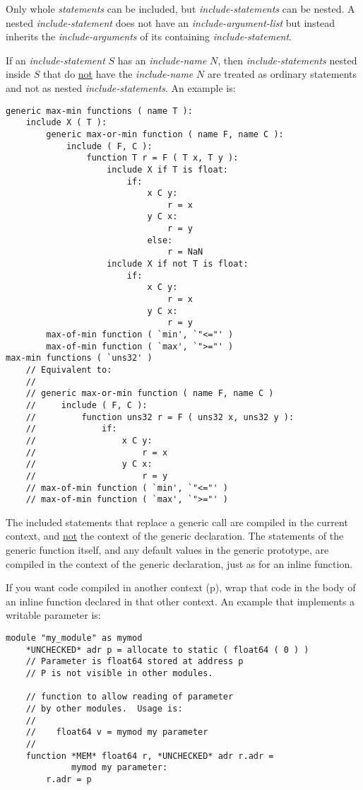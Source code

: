 \documentclass[12pt]{article}
\newcommand{\pagref}[1]{p\pageref{#1}}
\newenvironment{indpar}[1][0.3in]%
	{\begin{list}{}%
		     {\setlength{\itemsep}{0in}%
		      \setlength{\topsep}{0in}%
		      \setlength{\parsep}{1ex}%
		      \setlength{\labelwidth}{#1}%
		      \setlength{\leftmargin}{#1}%
		      \addtolength{\leftmargin}{\labelsep}}%
	 \item}%
	{\end{list}}
\begin{document}
Only whole {\em statements} can be included, but {\em include-statements}
can be nested.  A nested {\em include-statement} does not have an
{\em include-argument-list} but instead inherits the {\em include-arguments}
of its containing {\em include-statement}.

If an {\em include-statement} $S$ has an {\em include-name} $N$, then
{\em include-statements} nested inside $S$ that do \underline{not}
have the {\em include-name} $N$ are treated as ordinary statements
and not as nested {\em include-statements}.  An example is:
\begin{indpar}\begin{verbatim}
generic max-min functions ( name T ):
    include X ( T ):
        generic max-or-min function ( name F, name C ):
            include ( F, C ):
                function T r = F ( T x, T y ):
                    include X if T is float:
                        if:
                            x C y:
                                r = x
                            y C x:
                                r = y
                            else:
                                r = NaN
                    include X if not T is float:
                        if:
                            x C y:
                                r = x
                            y C x:
                                r = y
        max-of-min function ( `min', `"<="' )
        max-of-min function ( `max', `">="' )
max-min functions ( `uns32' )
    // Equivalent to:
    //
    // generic max-or-min function ( name F, name C )
    //     include ( F, C ):
    //         function uns32 r = F ( uns32 x, uns32 y ):
    //             if:
    //                 x C y:
    //                     r = x
    //                 y C x:
    //                     r = y
    // max-of-min function ( `min', `"<="' )
    // max-of-min function ( `max', `">="' )
\end{verbatim}\end{indpar}

The included statements that replace a generic call are compiled in the
current context, and \underline{not} the context of the
generic declaration.  The statements of the generic function
itself, and any default values in the generic prototype,
are compiled in the context of the generic declaration,
just as for an inline function.

If you want code compiled in another
context (\pagref{CONTEXT}), wrap that code in the body of an inline function
declared in that other context.  An example that implements a writable
parameter is:
\begin{indpar}\begin{verbatim}
module "my_module" as mymod
    *UNCHECKED* adr p = allocate to static ( float64 ( 0 ) )
    // Parameter is float64 stored at address p
    // P is not visible in other modules.

    // function to allow reading of parameter
    // by other modules.  Usage is:
    //
    //    float64 v = mymod my parameter
    //
    function *MEM* float64 r, *UNCHECKED* adr r.adr =
             mymod my parameter:
        r.adr = p
\end{verbatim}\end{indpar}
\end{document}

